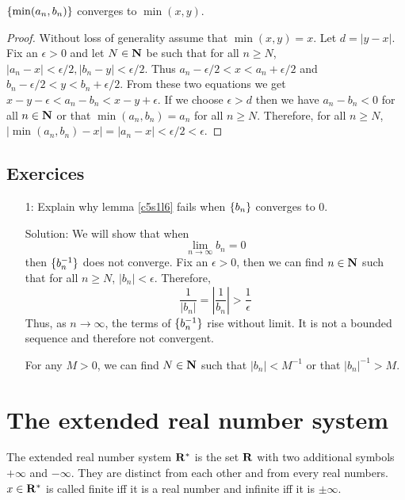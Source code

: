 \begin{lem}\label{c5s1l8}
$\{\min(a_n, b_n)\}$ converges to $\min(x, y)$.
\end{lem}
\begin{proof}
Without loss of generality assume that $\min(x, y) = x$. Let $d = |y - x|$. 
Fix an $\epsilon > 0$ and let $N \in \mathbf{N}$ be such that for all $n \ge N$,
$|a_n - x| < \epsilon/2, |b_n - y| < \epsilon/2$. Thus $a_n - \epsilon/2 < 
x < a_n + \epsilon/2$ and $b_n - \epsilon/2 < y < b_n + \epsilon/2$. From
these two equations we get $x - y - \epsilon < a_n - b_n < x - y + \epsilon$.
If we choose $\epsilon > d$ then we have $a_n - b_n < 0$ for all $n \in 
\mathbf{N}$ or that $\min(a_n, b_n) = a_n$ for all $n \ge N$. Therefore, for 
all $n \ge N$, $|\min(a_n, b_n) - x| = |a_n - x| < \epsilon/2 < \epsilon$.
\end{proof}

\subsection{Exercices}
\begin{enumerate}
\item[1:] Explain why lemma \ref{c5s1l6} fails when $\{b_n\}$ converges 
to $0$.
\item[Solution:] We will show that when
\[
\lim_{n \rightarrow \infty}b_n = 0
\]
then $\{b_n^{-1}\}$ does not converge. Fix an $\epsilon > 0$, then we can
find $n \in \mathbf{N}$ such that for all $n \ge N$, $|b_n| < \epsilon$. Therefore,
\[
\frac{1}{|b_n|} = \left|\frac{1}{b_n}\right| > \frac{1}{\epsilon}
\]
Thus, as $n \rightarrow \infty$, the terms of $\{b_n^{-1}\}$ rise without
limit. It is not a bounded sequence and therefore not convergent.

\begin{rem}
For any $M > 0$, we can find $N \in \mathbf{N}$ such that $|b_n| < M^{-1}$ or that
$|b_n|^{-1} > M$.
\end{rem}
\end{enumerate}

\section{The extended real number system}\label{c5s2}
\begin{defn}\label{c5s2d1}
The extended real number system $\mathbf{R}^\ast$ is the set $\mathbf{R}$ with two additional
symbols $+\infty$ and $-\infty$. They are distinct from each other and from
every real numbers. $x \in \mathbf{R}^\ast$ is called finite iff it is a real number
and infinite iff it is $\pm\infty$.
\end{defn}


